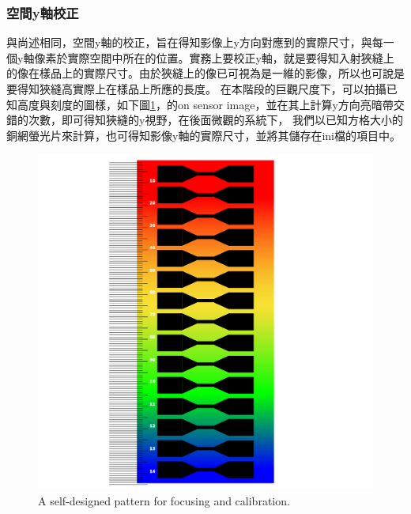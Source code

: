 \documentclass[12pt]{article}
\begin{document}
    \subsubsection{空間y軸校正}
    與尚述相同，空間y軸的校正，旨在得知影像上y方向對應到的實際尺寸，與每一個y軸像素於實際空間中所在的位置。實務上要校正y軸，就是要得知入射狹縫上的像在樣品上的實際尺寸。由於狹縫上的像已可視為是一維的影像，所以也可說是要得知狹縫高實際上在樣品上所應的長度。
    在本階段的巨觀尺度下，可以拍攝已知高度與刻度的圖樣，如下圖\ref{figure: self pattern}，的on sensor image，並在其上計算y方向亮暗帶交錯的次數，即可得知狹縫的y視野，在後面微觀的系統下，
    我們以已知方格大小的銅網螢光片來計算，也可得知影像y軸的實際尺寸，並將其儲存在ini檔的項目中。
    \begin{figure}[t]
        \centering
        \includegraphics[width=0.4\linewidth]{patternColor.jpg}
        \caption{A self-designed pattern for focusing and calibration.}
        \label{figure: self pattern}
    \end{figure}
\end{document}
